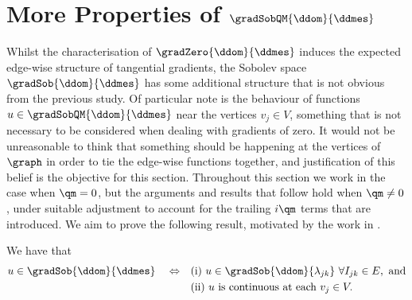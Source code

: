 \section{More Properties of $\gradSobQM{\ddom}{\ddmes}$} \label{sec:VertexContinuity}
Whilst the characterisation of $\gradZero{\ddom}{\ddmes}$ induces the expected edge-wise structure of tangential gradients, the Sobolev space $\gradSob{\ddom}{\ddmes}$ has some additional structure that is not obvious from the previous study.
Of particular note is the behaviour of functions $u\in\gradSobQM{\ddom}{\ddmes}$ near the vertices $v_j\in V$, something that is not necessary to be considered when dealing with gradients of zero.
It would not be unreasonable to think that something should be happening at the vertices of $\graph$ in order to tie the edge-wise functions together, and justification of this belief is the objective for this section.
Throughout this section we work in the case when $\qm = 0$, but the arguments and results that follow hold when $\qm\neq0$, under suitable adjustment to account for the trailing $i\qm$ terms that are introduced.
We aim to prove the following result, motivated by the work in \cite{zhikov2002homogenization}.
\begin{theorem} \label{thm:CharGradSob}
	We have that
	\begin{align*}
		u\in\gradSob{\ddom}{\ddmes} \quad \Leftrightarrow 
		&\quad\text{(i)} \ u\in\gradSob{\ddom}{\lambda_{jk}} \ \forall I_{jk}\in E, \text{ and}\\
		&\quad\text{(ii)} \ u \text{ is continuous at each } v_j\in V.
	\end{align*}
\end{theorem}

